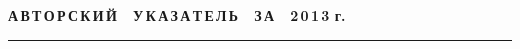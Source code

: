 
\def\stat{cont}
{%
\raggedleft\Large \bf%
А\,В\,Т\,О\,Р\,С\,К\,И\,Й\ \ У\,К\,А\,З\,А\,Т\,Е\,Л\,Ь\ \ З\,А\ \ 2\,0\,1\,3 г. \vskip 17pt
    \hrule
    \par
{} }

\label{st\stat}

\def\tit{\ }

\def\aut{\ }
\def\auf{\ }

\def\leftkol{\ } %

\def\rightkol{\ } %

\titele{\tit}{\aut}{\auf}{\leftkol}{\rightkol}

\vspace*{-12pt}
\vspace*{-12pt}

